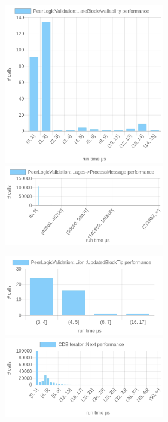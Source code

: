 \documentclass{article}
\begin{document}
\begin{table}
	\includegraphics[width=7cm]{images/mumbai/chartPeerLogicValidation_3A_3AProcessMessages-_3EProcessMessage-_3EUpdateBlockAvailability.png}
	\includegraphics[width=7cm]{images/mumbai/chartPeerLogicValidation_3A_3AProcessMessages-_3EProcessMessage.png}
	
	\includegraphics[width=7cm]{images/mumbai/chartPeerLogicValidation_3A_3AProcessMessages-_3EProcessMessage-_3EProcessMessage-_3EPeerLogicValidation_3A_3AUpdatedBlockTip.png}
	\includegraphics[width=7cm]{images/mumbai/chartCDBIterator_3A_3ANext.png}
	

\end{table}
\end{document}
